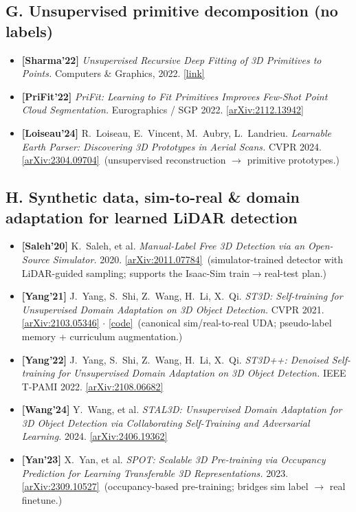 \documentclass[10pt,a4paper]{article}
\begin{document}
{\subsection*{G. Unsupervised primitive decomposition (no labels)}
\begin{itemize}[leftmargin=1.4em,itemsep=3pt,topsep=2pt]
  \item \textbf{[Sharma'22]} \emph{Unsupervised Recursive Deep Fitting of 3D Primitives to
  Points.} Computers \& Graphics, 2022.
  \href{https://www.sciencedirect.com/science/article/abs/pii/S0097849321002314}{[link]}
  \item \textbf{[PriFit'22]} \emph{PriFit: Learning to Fit Primitives Improves Few-Shot Point
  Cloud Segmentation.} Eurographics / SGP 2022.
  \href{https://arxiv.org/abs/2112.13942}{[arXiv:2112.13942]}
  \item \textbf{[Loiseau'24]} R.~Loiseau, E.~Vincent, M.~Aubry, L.~Landrieu. \emph{Learnable
  Earth Parser: Discovering 3D Prototypes in Aerial Scans.} CVPR 2024.
  \href{https://arxiv.org/abs/2304.09704}{[arXiv:2304.09704]} \,(unsupervised reconstruction
  $\to$ primitive prototypes.)
\end{itemize}

\subsection*{H. Synthetic data, sim-to-real \& domain adaptation for learned LiDAR detection}
\begin{itemize}[leftmargin=1.4em,itemsep=3pt,topsep=2pt]
  \item \textbf{[Saleh'20]} K.~Saleh, et al. \emph{Manual-Label Free 3D Detection via an
  Open-Source Simulator.} 2020. \href{https://arxiv.org/abs/2011.07784}{[arXiv:2011.07784]}
  \,(simulator-trained detector with LiDAR-guided sampling; supports the Isaac-Sim
  train$\to$real-test plan.)
  \item \textbf{[Yang'21]} J.~Yang, S.~Shi, Z.~Wang, H.~Li, X.~Qi. \emph{ST3D: Self-training
  for Unsupervised Domain Adaptation on 3D Object Detection.} CVPR 2021.
  \href{https://arxiv.org/abs/2103.05346}{[arXiv:2103.05346]}
  $\cdot$ \href{https://github.com/CVMI-Lab/ST3D}{[code]} \,(canonical sim/real-to-real UDA;
  pseudo-label memory + curriculum augmentation.)
  \item \textbf{[Yang'22]} J.~Yang, S.~Shi, Z.~Wang, H.~Li, X.~Qi. \emph{ST3D++: Denoised
  Self-training for Unsupervised Domain Adaptation on 3D Object Detection.} IEEE T-PAMI 2022.
  \href{https://arxiv.org/abs/2108.06682}{[arXiv:2108.06682]}
  \item \textbf{[Wang'24]} Y.~Wang, et al. \emph{STAL3D: Unsupervised Domain Adaptation for 3D
  Object Detection via Collaborating Self-Training and Adversarial Learning.} 2024.
  \href{https://arxiv.org/abs/2406.19362}{[arXiv:2406.19362]}
  \item \textbf{[Yan'23]} X.~Yan, et al. \emph{SPOT: Scalable 3D Pre-training via Occupancy
  Prediction for Learning Transferable 3D Representations.} 2023.
  \href{https://arxiv.org/abs/2309.10527}{[arXiv:2309.10527]} \,(occupancy-based pre-training;
  bridges sim label $\to$ real finetune.)
\end{itemize}

} %
\end{document}
